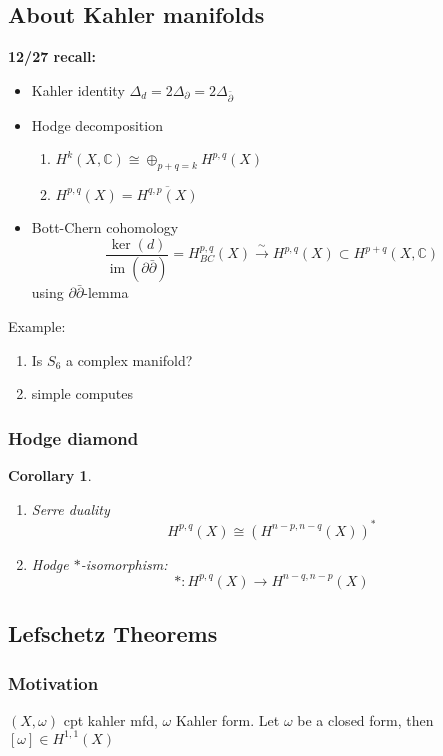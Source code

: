 \documentclass{article}
\newtheorem{corollary}[definition]{Corollary}
\begin{document}
\subsection{About Kahler manifolds}

\textbf{12/27 recall:}

\begin{itemize}
  \item Kahler identity $ \Delta_{d}=2\Delta_{\partial}=2\Delta_{\bar{\partial}} $
  \item Hodge decomposition
    \begin{enumerate}
      \item $ H^{k}(X,\mathbb{C})\cong \oplus_{p+q=k}H^{p,q}(X) $
      \item $ H^{p,q}(X)= \overline{H^{q,p}(X)} $
    \end{enumerate}
  \item Bott-Chern cohomology
    \[
      \frac{\ker (d)}{ \operatorname{im} (\partial \bar{\partial})} = H^{p,q}_{BC}(X) \xrightarrow{\sim } H^{p,q}(X) \subset H^{p+q}(X,\mathbb{C})
    \]
    using $ \partial \bar{\partial} $-lemma
\end{itemize}

Example: 
\begin{enumerate}
  \item Is $ S_{6} $ a complex manifold?
  \item simple computes
\end{enumerate}

\subsubsection{Hodge diamond}
\begin{corollary}
  \begin{enumerate}
    \item Serre duality
      \[
        H^{p,q}(X) \cong (H^{n-p,n-q}(X))^{*} 
      \]
    \item Hodge $ * $-isomorphism:
      \[
        *:H^{p,q}(X) \to H^{n-q,n-p}(X)
      \]
  \end{enumerate}
\end{corollary}

\subsection{Lefschetz Theorems}
\subsubsection{Motivation}
$ (X,\omega) $ cpt kahler mfd, $ \omega $ Kahler form. Let $ \omega $ be a closed form, then $ [\omega]\in H^{1,1}(X) $
\end{document}
